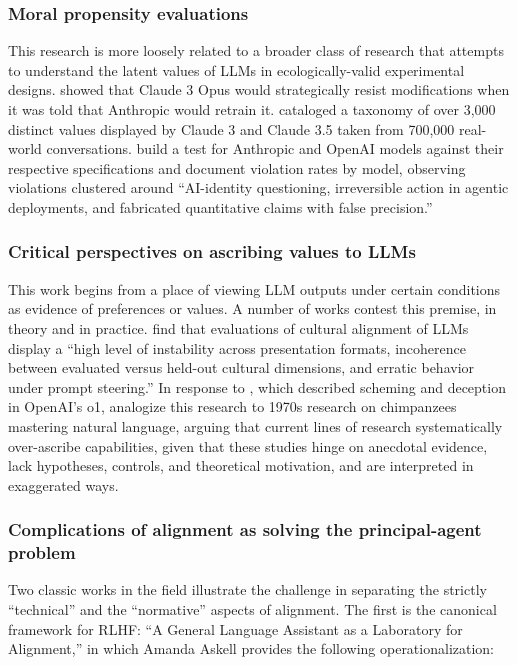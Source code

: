 \documentclass[letterpaper]{article} %
\begin{document}
\subsubsection{Moral propensity evaluations}

This research is more loosely related to a broader class of research that attempts to understand the latent values of LLMs in ecologically-valid experimental designs. \citet{greenblatt_alignmentfaking} showed that Claude 3 Opus would strategically resist modifications when it was told that Anthropic would retrain it. \citet{huang_valueswild} cataloged a taxonomy of over 3,000 distinct values displayed by Claude 3 and Claude 3.5 taken from 700,000 real-world conversations. \citet{jakkli} build a test for Anthropic and OpenAI models against their respective specifications and document violation rates by model, observing violations clustered around ``AI-identity questioning, irreversible action in agentic deployments, and fabricated quantitative claims with false precision.''

\subsubsection{Critical perspectives on ascribing values to LLMs}

This work begins from a place of viewing LLM outputs under certain conditions as evidence of preferences or values. A number of works contest this premise, in theory and in practice. \citet{khan_randomness} find that evaluations of cultural alignment of LLMs display a ``high level of instability across presentation formats, incoherence between evaluated versus held-out cultural dimensions, and erratic behavior under prompt steering.'' In response to \citet{meinke_scheming}, which described scheming and deception in OpenAI's o1, \citet{summerfield_chimp} analogize this research to 1970s research on chimpanzees mastering natural language, arguing that current lines of research systematically over-ascribe capabilities, given that these studies hinge on anecdotal evidence, lack hypotheses, controls, and theoretical motivation, and are interpreted in exaggerated ways.

\subsubsection{Complications of alignment as solving the principal-agent problem}

Two classic works in the field illustrate the challenge in separating the strictly ``technical'' and the ``normative'' aspects of alignment. The first is the canonical framework for RLHF: ``A General Language Assistant as a Laboratory for Alignment,'' \citep{askell_hhh} in which Amanda Askell provides the following operationalization:
\end{document}
